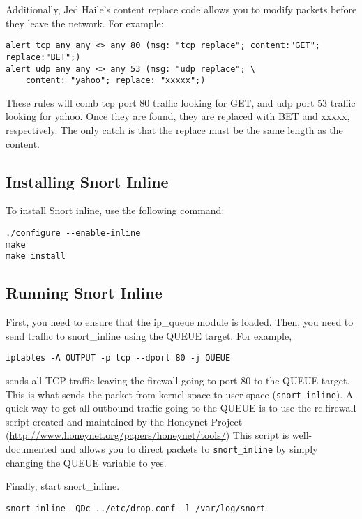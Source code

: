 \documentclass[english]{report}
\begin{document}
Additionally, Jed Haile's content replace code allows you to modify packets
before they leave the network.  For example:

\begin{verbatim}
alert tcp any any <> any 80 (msg: "tcp replace"; content:"GET"; replace:"BET";)
alert udp any any <> any 53 (msg: "udp replace"; \
    content: "yahoo"; replace: "xxxxx";)
\end{verbatim}

These rules will comb tcp port 80 traffic looking for GET, and udp port 53
traffic looking for yahoo.  Once they are found, they are replaced with BET and
xxxxx, respectively.  The only catch is that the replace must be the same
length as the content.


\subsection{Installing Snort Inline\label{InlineInstall}}
To install Snort inline, use the following command:
\begin{verbatim}
./configure --enable-inline
make
make install
\end{verbatim} 


\subsection{Running Snort Inline}

First, you need to ensure that the ip\_queue module is loaded.  Then,
you need to send traffic to snort\_inline using the QUEUE target.  For
example,
\begin{verbatim}
iptables -A OUTPUT -p tcp --dport 80 -j QUEUE
\end{verbatim}
sends all TCP traffic leaving the firewall going to port 80 to the QUEUE
target.  This is what sends the packet from kernel space to user space 
(\texttt{snort\_inline}).  A quick way to get all outbound traffic going to the
QUEUE is to use the rc.firewall script created and maintained by the 
Honeynet Project (\url{http://www.honeynet.org/papers/honeynet/tools/})
This script is well-documented and allows you to direct packets
to \texttt{snort\_inline} by simply changing the QUEUE variable to yes.

Finally, start snort\_inline.

\begin{verbatim}
snort_inline -QDc ../etc/drop.conf -l /var/log/snort
\end{verbatim}
\end{document}
